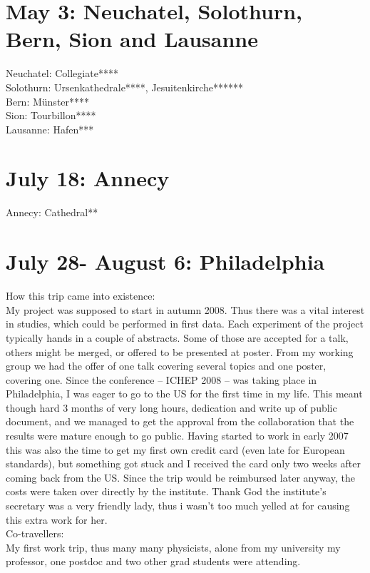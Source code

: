 \section{May 3: Neuchatel, Solothurn, Bern, Sion and Lausanne}
\label{2008:Swisstrip}

Neuchatel: Collegiate****\\
Solothurn: Ursenkathedrale****, Jesuitenkirche******\\
Bern: M\"unster****\\
Sion: Tourbillon****\\
Lausanne: Hafen***

\section{July 18: Annecy}
\label{2008:Annecy}

Annecy: Cathedral**

\section{July 28- August 6: Philadelphia}
\label{2008:Philadelphia}

How this trip came into existence:\\
My project was supposed to start in autumn 2008. Thus there was a vital interest in studies, which could be performed in first data. Each experiment of the project typically hands in a couple of abstracts. Some of those are accepted for a talk, others might be merged, or offered to be presented at poster. From my working group we had the offer of one talk covering several topics and one poster, covering one. Since the conference -- ICHEP 2008 -- was taking place in Philadelphia, I was eager to go to the US for the first time in my life. This meant though hard 3 months of very long hours, dedication and write up of public document, and we managed to get the approval from the collaboration that the results were mature enough to go public. Having started to work in early 2007 this was also the time to get my first own credit card (even late for European standards), but something got stuck and I received the card only two weeks after coming back from the US. Since the trip would be reimbursed later anyway, the costs were taken over directly by the institute. Thank God the institute's secretary was a very friendly lady, thus i wasn't too much yelled at for causing this extra work for her.\\

Co-travellers:\\
My first work trip, thus many many physicists, alone from my university my professor, one postdoc and two other grad students were attending.\\ 

